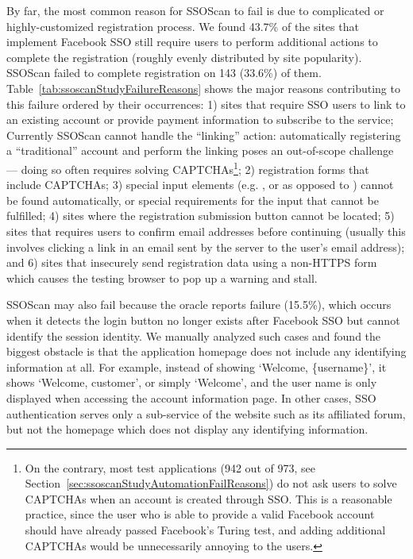  By far, the most common reason for SSOScan to fail is due to complicated or highly-customized registration process.  We found 43.7\% of the sites that implement Facebook SSO still require users to perform additional actions to complete the registration (roughly evenly distributed by site popularity).  SSOScan failed to complete registration on 143 (33.6\%) of them.  Table~\ref{tab:ssoscanStudyFailureReasons} shows the major reasons contributing to this failure ordered by their occurrences: 1) sites that require SSO users to link to an existing account or provide payment information to subscribe to the service; Currently SSOScan cannot handle the ``linking'' action: automatically registering a ``traditional'' account and perform the linking poses an out-of-scope challenge --- doing so often requires solving CAPTCHAs\footnote{On the contrary, most test applications (942 out of 973, see Section~\ref{sec:ssoscanStudyAutomationFailReasons}) do not ask users to solve CAPTCHAs when an account is created through SSO.  This is a reasonable practice, since the user who is able to provide a valid Facebook account should have already passed Facebook's Turing test, and adding additional CAPTCHAs would be unnecessarily annoying to the users.}; 2) registration forms that include CAPTCHAs; 3) special input elements (e.g. ,  or  as opposed to ) cannot be found automatically, or special requirements for the input that cannot be fulfilled; 4) sites where the registration submission button cannot be located; 5) sites that requires users to confirm email addresses before continuing (usually this involves clicking a link in an email sent by the server to the user's email address); and 6) sites that insecurely send registration data using a non-HTTPS form which causes the testing browser to pop up a warning and stall.



 SSOScan may also fail because the oracle reports failure (15.5\%), which occurs when it detects the login button no longer exists after Facebook SSO but cannot identify the session identity.  We manually analyzed such cases and found the biggest obstacle is that the application homepage does not include any identifying information at all.  For example, instead of showing `Welcome, \{username\}', it shows `Welcome, customer', or simply `Welcome', and the user name is only displayed when accessing the account information page.  In other cases, SSO authentication serves only a sub-service of the website such as its affiliated forum, but not the homepage which does not display any identifying information.


